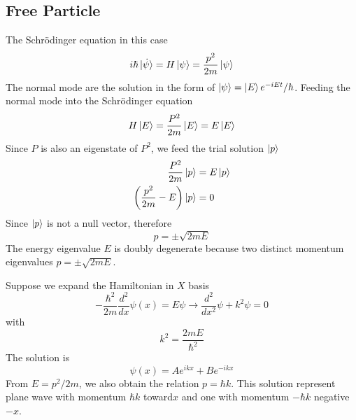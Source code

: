 \documentclass[../../../main.tex]{subfiles}
\begin{document}
\subsection{Free Particle}
The Schrödinger equation in this case
\begin{equation*}
  i \hbar \ket{\dot{\psi}}=H \ket{\psi}=\frac{p^2 }{2m }\ket{\psi}
\end{equation*}
The normal mode are the solution in the form of $\ket{\psi }= \ket{E }e^{-iE t}/\hbar$.
Feeding the normal mode into the Schrödinger equation
\begin{equation*}
  H \ket{E}=\frac{P^2 }{2m }\ket{E}=E \ket{E}
\end{equation*}
Since $P$ is also an eigenstate of $P^2 $, we feed the trial solution $\ket{p}$
\begin{align*}
  \frac{P^2 }{2m }\ket{p }                    & =  E \ket{p } \\
  \left( \frac{p^2 }{2m }-E  \right) \ket{p } & = 0
\end{align*}
Since $\ket{p}$ is not a null vector, therefore
\begin{equation*}
  p=\pm \sqrt{2mE}
\end{equation*}
The energy eigenvalue $E$ is doubly degenerate because two distinct momentum eigenvalues $p=\pm \sqrt{2mE}$.

Suppose we expand the Hamiltonian in $X$ basis
\begin{equation*}
  -\frac{\hbar^2 }{2m }\frac{d^2 }{dx } \psi(x)=E\psi
  \rightarrow
  \frac{d^2 }{dx^2}\psi+k^2\psi=0 
\end{equation*}
with
\begin{equation*}
  k^2=\frac{2mE }{\hbar^2}
\end{equation*}
The solution is
\begin{equation*}
  \psi(x)=Ae^{ikx}+Be^{-ikx}
\end{equation*}
From $E=p^2/2m$, we also obtain the relation $p=\hbar k$.
This solution represent plane wave with momentum $\hbar k$ toward$x$ and one with momentum $-\hbar k$ negative $-x$.
\end{document}
